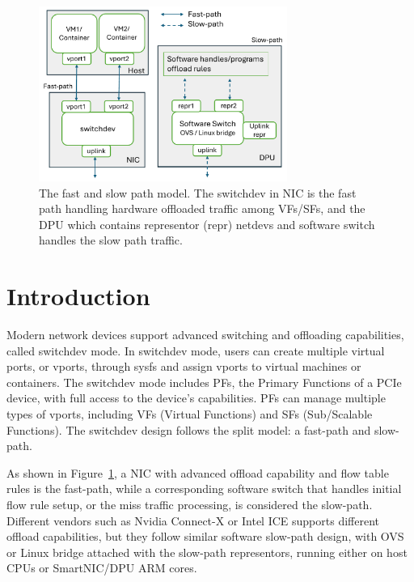 \documentclass[letterpaper]{article}
\begin{document}
\begin{figure}[h]
\includegraphics[width=3.2in]{arch.pdf}
\caption{The fast and slow path model. The switchdev in NIC is the fast path handling
hardware offloaded traffic among VFs/SFs, and the DPU which contains representor (repr) netdevs and software switch handles the slow path traffic.}
\label{fig:arch}
\end{figure}



\section{Introduction}
Modern network devices support advanced switching and offloading
capabilities, called switchdev mode. In switchdev mode, users can
create multiple virtual ports, or vports, through sysfs and assign
vports to virtual machines or containers. The switchdev mode includes
PFs, the Primary Functions of a PCIe device, with full access to the device's
capabilities. PFs can manage multiple types of vports, including
VFs (Virtual Functions) and SFs (Sub/Scalable Functions).
The switchdev design follows the split model: a fast-path and
slow-path.

As shown in Figure~\ref{fig:arch}, a NIC with advanced offload capability
and flow table rules is
the fast-path, while a corresponding software switch that handles
initial flow rule setup, or the miss traffic processing, is considered the
slow-path. Different vendors such as Nvidia Connect-X or Intel ICE
supports different offload capabilities, but they follow similar
software slow-path design, with OVS or Linux bridge attached with
the slow-path representors, running either on host CPUs or
SmartNIC/DPU ARM cores.
\end{document}
